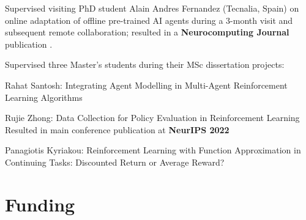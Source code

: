 \documentclass[a4paper,12pt]{article}
\begin{document}
\begin{expblock}
    Supervised visiting PhD student Alain Andres Fernandez (Tecnalia, Spain) on online adaptation of offline pre-trained AI agents during a 3-month visit and subsequent remote collaboration; resulted in a \textbf{Neurocomputing Journal} publication \cite{andres2024using}.
\end{expblock}

\begin{expblock}[0.9\linewidth]
    Supervised three Master's students during their MSc dissertation projects:
    \begin{explist}
	\item Rahat Santosh: Integrating Agent Modelling in Multi-Agent Reinforcement Learning Algorithms
	\item Rujie Zhong: Data Collection for Policy Evaluation in Reinforcement Learning\\
	Resulted in main conference publication at \textbf{NeurIPS 2022} \cite{zhong2022datacollection}%
	\item Panagiotis Kyriakou: Reinforcement Learning with Function Approximation in Continuing Tasks: Discounted Return or Average Reward?
    \end{explist}
\end{expblock}

\section{Funding}
\end{document}

